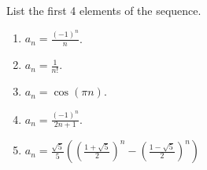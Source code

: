 List the first 4 elements of the sequence. 
\begin{multicols}{2}
\begin{enumerate}
\item $\displaystyle a_n= \frac{(-1)^n}{n}$.
\item $\displaystyle a_n=\frac{1}{n!}$.
\item $\displaystyle a_n=\cos (\pi n)$.
\item $\displaystyle a_n=\frac{(-1)^n}{2n+1}$.
\item $\displaystyle a_n=\frac{\sqrt{5}}{5}\left( \left(\frac{1+\sqrt{5 }}{2} \right)^n- \left(\frac{1-\sqrt{5}}{2}\right)^n\right) $
\end{enumerate}
\end{multicols}